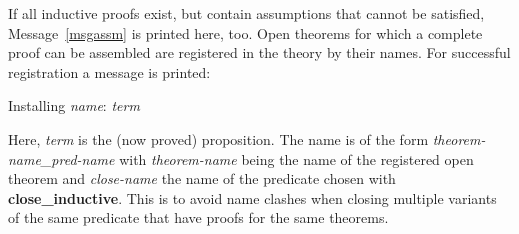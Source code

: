 If all inductive proofs exist, but contain assumptions that cannot be satisfied, Message~\ref{msgassm} is printed here, too.
%
Open theorems for which a complete proof can be assembled are registered in the theory by their names.
%
For successful registration a message is printed:

\begin{msg}
Installing \emph{name}: \emph{term}
\end{msg}

Here, \emph{term} is the (now proved) proposition.
%
The name is of the form \emph{theorem-name\_pred-name} with \emph{theorem-name} being the name of the registered open theorem and \emph{close-name} the name of the predicate chosen with \textbf{close\_inductive}.
%
This is to avoid name clashes when closing multiple variants of the same predicate that have proofs for the same theorems.
%
